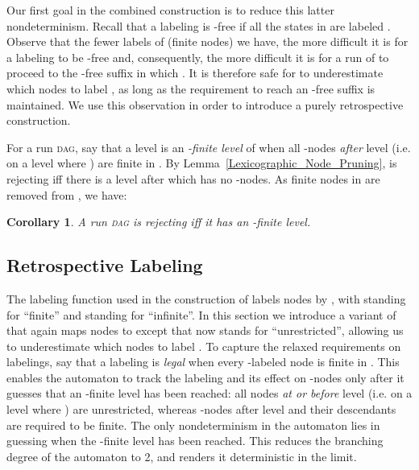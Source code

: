 \documentclass{LMCS}
\newcommand{\DAG}{\textsc{dag}\xspace}
\newtheorem{corollary}[theorem]{Corollary}
\begin{document}
Our first goal in the combined construction is to reduce this latter nondeterminism.  Recall that a
labeling is -free if all the states in  are labeled .  Observe that the fewer labels of
 (finite nodes) we have, the more difficult it is for a labeling to be -free and,
consequently, the more difficult it is for a run of  to proceed to the -free suffix in
which .  It is therefore safe for  to underestimate which nodes to label , as long
as the requirement to reach an -free suffix is maintained.  We use this observation in order to
introduce a purely retrospective construction.

For a run \DAG , say that a level  is an \emph{-finite level} of  when all -nodes
{\em after} level  (i.e. on a level  where ) are finite in .  
By Lemma~\ref{Lexicographic_Node_Pruning},  is rejecting iff there is a level after which
 has no -nodes. As finite nodes in  are removed from , we
have:

\begin{corollary}\label{Rejecting_iff_k}
A run \DAG  is rejecting iff it has an -finite level.
\end{corollary}

\subsection{Retrospective Labeling}
The labeling function  used in the construction of  labels nodes by ,
with  standing for ``finite'' and  standing for ``infinite''. In this section we
introduce a variant of  that again maps nodes to  except that now 
stands for ``unrestricted'', allowing us to underestimate which nodes to label
. To capture the relaxed requirements on labelings, say that a labeling  is
\emph{legal} when every -labeled node is finite in .  This enables the automaton to
track the labeling and its effect on -nodes only after it guesses that an -finite level 
has been reached: all nodes {\em at or before} level  (i.e. on a level  where ) are
unrestricted, whereas -nodes after level  and their descendants are required to be finite. The only nondeterminism
in the automaton lies in guessing when the -finite level has been reached.  This reduces the
branching degree of the automaton to 2, and renders it deterministic in the limit. 
\end{document}
